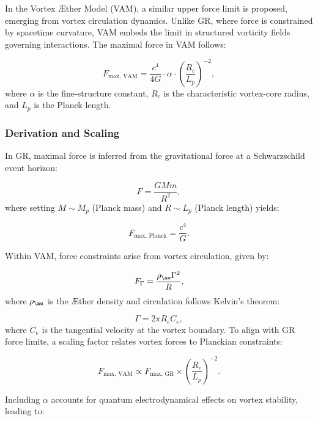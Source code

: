 In the Vortex \AE ther Model (VAM), a similar upper force limit is proposed, emerging from vortex circulation dynamics. Unlike GR, where force is constrained by spacetime curvature, VAM embeds the limit in structured vorticity fields governing interactions. The maximal force in VAM follows:


\begin{equation*}
    F_{\text{max, VAM}} = \frac{c^4}{4G} \cdot \alpha \cdot \left(\frac{R_c}{L_p}\right)^{-2},
\end{equation*}
where $\alpha$ is the fine-structure constant, $R_c$ is the characteristic vortex-core radius, and $L_p$ is the Planck length.


\subsubsection*{Derivation and Scaling}
In GR, maximal force is inferred from the gravitational force at a Schwarzschild event horizon:


\begin{equation*}
    F = \frac{GMm}{R^2},
\end{equation*}
where setting $M \sim M_p$ (Planck mass) and $R \sim L_p$ (Planck length) yields:


\begin{equation*}
    F_{\text{max, Planck}} = \frac{c^4}{G}.
\end{equation*}


Within VAM, force constraints arise from vortex circulation, given by:


\begin{equation*}
    F_{\Gamma} = \frac{\rho_{\ae} \Gamma^2}{R},
\end{equation*}
where $\rho_{\ae}$ is the \AE ther density and circulation follows Kelvin’s theorem:


\begin{equation*}
    \Gamma = 2\pi R_c C_e,
\end{equation*}
where $C_e$ is the tangential velocity at the vortex boundary. To align with GR force limits, a scaling factor relates vortex forces to Planckian constraints:


\begin{equation*}
    F_{\text{max, VAM}} \propto F_{\text{max, GR}} \times \left(\frac{R_c}{L_p}\right)^{-2}.
\end{equation*}


Including $\alpha$ accounts for quantum electrodynamical effects on vortex stability, leading to:


